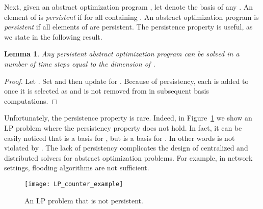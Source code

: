 \documentclass[onecolumn,journal,letterpaper]{IEEEtran}
\newtheorem{lemma}[theorem]{Lemma}
{\theorembodyfont{\rmfamily} \newtheorem{conjecture}[theorem]{Conjecture}
\newtheorem{remark}[theorem]{Remark}
\newtheorem{remarks}[theorem]{Remarks}
\newtheorem{example}[theorem]{Example}
\newtheorem{algo}[theorem]{Algorithm}
\newtheorem{problem}[theorem]{Problem}}
\begin{document}
Next, given an abstract optimization program , let  denote
the basis of any .  An element  of  is
\emph{persistent} if  for all  containing .  An
abstract optimization program  is \emph{persistent} if all
elements of  are persistent. The persistence property is useful, as we
state in the following result.
\begin{lemma}
  \label{lemma:all-is-simple-if-persistent}
  Any persistent abstract optimization program  can be solved in a
  number of time steps equal to the dimension of .
\end{lemma}
\begin{proof}
  Let . Set  and
  then update  for . Because
  of persistency, each  is added to  once it is selected as
   and is not removed from  in subsequent basis computations.
\end{proof}
Unfortunately, the persistence property is rare.  Indeed, in
Figure~\ref{fig:LP_counter_example} we show an LP problem where the
persistency property does not hold. In fact, it can be easily noticed that
 is a basis for , but  is a
basis for . In other words  is not violated by
.  The lack of persistency complicates the design of
centralized and distributed solvers for abstract optimization problems. For
example, in network settings, flooding algorithms are not sufficient.

\begin{figure}[htbp]
  \centering
\texttt{[image: LP\_counter\_example]}
  \caption{An LP problem that is not persistent.}
  \label{fig:LP_counter_example}
\end{figure}
\end{document}
